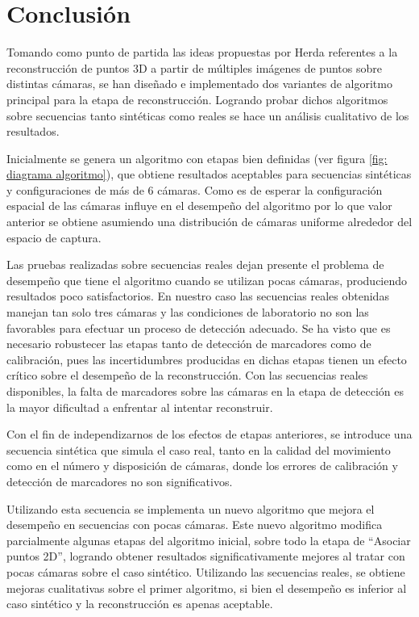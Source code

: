 \section{Conclusión} 

Tomando como punto de partida las ideas propuestas por Herda referentes a la reconstrucción de puntos 3D a partir de múltiples imágenes de puntos sobre distintas cámaras,  se han diseñado e implementado dos variantes de algoritmo principal para la etapa de reconstrucción. Logrando probar dichos algoritmos sobre secuencias tanto sintéticas como reales se hace un análisis cualitativo de los resultados.


Inicialmente se genera un algoritmo con etapas bien definidas (ver figura \ref{fig: diagrama algoritmo}), que obtiene resultados aceptables para secuencias sintéticas y configuraciones de más de 6 cámaras. Como es de esperar la configuración espacial de las cámaras influye en el desempeño del algoritmo por lo que valor anterior se obtiene asumiendo una distribución de cámaras uniforme alrededor del espacio de captura.


Las pruebas realizadas sobre secuencias reales dejan presente el problema de desempeño que tiene el algoritmo cuando se utilizan pocas cámaras, produciendo resultados poco satisfactorios. 
En nuestro caso las secuencias reales obtenidas manejan tan solo tres cámaras y las condiciones de laboratorio no son las favorables para efectuar un proceso de detección adecuado. Se ha visto que es necesario robustecer las etapas tanto de detección de marcadores  como de calibración, pues las incertidumbres producidas en dichas etapas tienen un efecto crítico sobre el desempeño de la reconstrucción. Con las secuencias reales disponibles, la falta de marcadores sobre las cámaras en la etapa de detección es la mayor dificultad a enfrentar al intentar reconstruir. 



Con el fin de independizarnos de los efectos de etapas anteriores, se introduce una secuencia sintética que simula el caso real, tanto en la calidad del movimiento como en el número y disposición de cámaras, donde los errores de calibración y detección de marcadores no son significativos.


Utilizando esta secuencia se implementa un nuevo algoritmo que mejora el desempeño en secuencias con pocas cámaras. Este nuevo algoritmo modifica parcialmente algunas etapas del algoritmo inicial, sobre todo la etapa de “Asociar puntos 2D”, logrando obtener resultados significativamente mejores al tratar con pocas cámaras sobre el caso sintético.
Utilizando las secuencias reales, se obtiene mejoras cualitativas sobre el primer algoritmo, si bien el desempeño es inferior al caso sintético y la reconstrucción es apenas aceptable.  \\ 



